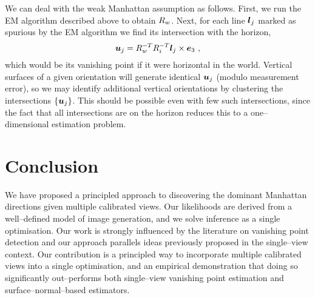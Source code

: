 We can deal with the weak Manhattan assumption as follows. First, we
run the EM algorithm described above to obtain $\SceneR$. Next, for
each line $\LineSeg_j$ marked as spurious by the EM algorithm we find
its intersection with the horizon,
\begin{equation}
  \vect{u}_j = \SceneR^{-T} R_i^{-T} \LineSeg_j \times \ez ~,
\end{equation}
which would be its vanishing point if it were horizontal in the
world. Vertical surfaces of a given orientation will generate
identical $\vect{u}_j$ (modulo measurement error), so we may identify
additional vertical orientations by clustering the intersections
$\{\vect{u}_j\}$. This should be possible even with few such
intersections, since the fact that all intersections are on the
horizon reduces this to a one--dimensional estimation problem.


\section{Conclusion}

We have proposed a principled approach to discovering the dominant
Manhattan directions given multiple calibrated views. Our likelihoods
are derived from a well--defined model of image generation, and we
solve inference as a single optimisation. Our work is strongly
influenced by the literature on vanishing point detection and our
approach parallels ideas previously proposed in the single--view
context. Our contribution is a principled way to incorporate multiple
calibrated views into a single optimisation, and an empirical
demonstration that doing so significantly out--performs both
single--view vanishing point estimation and surface--normal--based
estimators.
